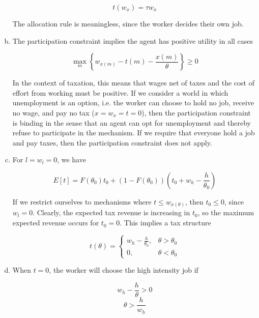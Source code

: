 \documentclass{article}
\begin{document}
\begin{enumerate}[(a)]
	\begin{equation*}
	t(w_x) = \tau w_x
	\end{equation*}

	The allocation rule is meaningless, since the worker decides their own job.

	\item

	The participation constraint implies the agent has positive utility in all cases

	\begin{equation*}
	\max_m \left \{ w_{x(m)} - t(m) - \frac{x(m)}{\theta} \right \} \geq 0
	\end{equation*}

	In the context of taxation, this means that wages net of taxes and the cost of effort from working must be positive. If we consider a world in which unemployment is an option, i.e. the worker can choose to hold no job, receive no wage, and pay no tax ($x = w_x = t =0$), then the participation constraint is binding in the sense that an agent can opt for unemployment and thereby refuse to participate in the mechanism. If we require that everyone hold a job and pay taxes, then the participation constraint does not apply.

	\item

	For $l = w_l = 0$, we have

	\begin{equation*}
	E[t] = F(\theta_0) t_0 + (1 - F(\theta_0)) (t_0 + w_h - \frac{h}{\theta_0})
	\end{equation*}

	If we restrict ourselves to mechanisms where $t \leq w_{x(\theta)}$, then $t_0 \leq 0$, since $w_l = 0$. Clearly, the expected tax revenue is increasing in $t_0$, so the maximum expected revenue occurs for $t_0 = 0$. This implies a tax structure

	\begin{equation*}
	t(\theta) =  \begin{cases} 
	      w_h - \frac{h}{\theta_0}, &\theta > \theta_0 \\
	      0, & \theta < \theta_0
	   \end{cases}
	\end{equation*}

	\item

	When $t=0$, the worker will choose the high intensity job if

	\begin{equation*}
	w_h - \frac{h}{\theta} > 0
	\end{equation*}
	\begin{equation*}
	\theta > \frac{h}{w_h}
	\end{equation*}


\end{enumerate}
\end{document}
